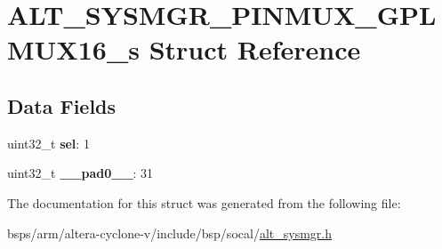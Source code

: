 \hypertarget{structALT__SYSMGR__PINMUX__GPLMUX16__s}{}\section{A\+L\+T\+\_\+\+S\+Y\+S\+M\+G\+R\+\_\+\+P\+I\+N\+M\+U\+X\+\_\+\+G\+P\+L\+M\+U\+X16\+\_\+s Struct Reference}
\label{structALT__SYSMGR__PINMUX__GPLMUX16__s}
\subsection*{Data Fields}
\begin{DoxyCompactItemize}
\item 
\mbox{\label{structALT__SYSMGR__PINMUX__GPLMUX16__s_acc4857b74577dc45c2ac6b0b82e11f75}} 
uint32\+\_\+t {\bfseries sel}\+: 1
\item 
\mbox{\label{structALT__SYSMGR__PINMUX__GPLMUX16__s_a99b9ffd2bd9a6c82007d9ab516af3807}} 
uint32\+\_\+t {\bfseries \+\_\+\+\_\+pad0\+\_\+\+\_\+}\+: 31
\end{DoxyCompactItemize}


The documentation for this struct was generated from the following file\+:\begin{DoxyCompactItemize}
\item 
bsps/arm/altera-\/cyclone-\/v/include/bsp/socal/\mbox{\hyperlink{alt__sysmgr_8h}{alt\+\_\+sysmgr.\+h}}\end{DoxyCompactItemize}
